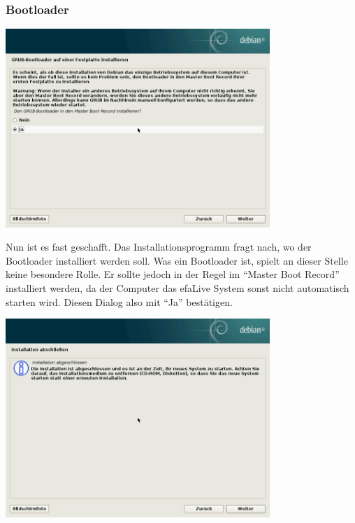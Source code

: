 \documentclass[a4paper,12pt,twoside]{article}
\begin{document}
\subsubsection{Bootloader}
\label{sct:bootloader}

\begin{minipage}{\linewidth}
    \centering
    \includegraphics[width=10cm]{screenshots/select_bootloader_mbr.png}
    \label{fig:inst_grub}
\end{minipage}
\bigskip

Nun ist es fast geschafft. Das Installationsprogramm fragt nach, wo der
Bootloader installiert werden soll. Was ein Bootloader ist, spielt an
dieser Stelle keine besondere Rolle. Er sollte jedoch in der Regel im
"`Master Boot Record"' installiert werden, da
der Computer das efaLive System sonst nicht automatisch starten wird.
Diesen Dialog also mit "`Ja"' bestätigen.

\begin{minipage}{\linewidth}
    \centering
    \includegraphics[width=10cm]{screenshots/finish_installation.png}
    \label{fig:abschluss}
\end{minipage}
\bigskip
\end{document}
